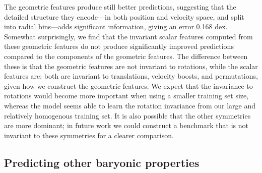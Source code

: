 The geometric features produce still better predictions, suggesting that the detailed structure they encode---in both position and velocity space, and split into radial bins---adds significant information, giving an error 0.168 dex.
Somewhat surprisingly, we find that the invariant scalar features computed from these geometric features do not produce significantly improved predictions compared to the components of the geometric features.
The difference between these is that the geometric features are not invariant to rotations, while the scalar features are; both are invariant to translations, velocity boosts, and permutations, given how we construct the geometric features.
We expect that the invariance to rotations would become more important when using a smaller training set size, whereas the model seems able to learn the rotation invariance from our large and relatively homogenous training set.
It is also possible that the other symmetries are more dominant; in future work we could construct a benchmark that is not invariant to these symmetries for a clearer comparison.


\subsection{Predicting other baryonic properties}
\label{sec:pred_galprops}

